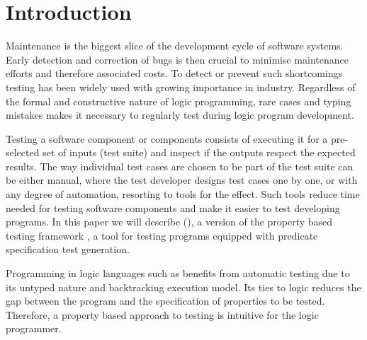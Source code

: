 
\section{Introduction}
\label{sec:intro}


Maintenance is the biggest slice of the development cycle of software
systems.
%
Early detection and correction of bugs is then crucial to minimise
maintenance efforts and therefore associated costs.
%
To detect or prevent such shortcomings testing has been widely used with
growing importance in industry.
%
Regardless of the formal and constructive nature of logic programming,
rare cases and typing mistakes makes it necessary to regularly test
during logic program development.

Testing a software component or components consists of executing it for
a pre-selected set of inputs (test suite) and inspect if the outputs
respect the expected results.
%
%
The way individual test cases are chosen to be part of the test suite
can be either manual, where the test developer designs test cases one by
one, or with any degree of automation, resorting to tools for the
effect.
%
Such tools reduce time needed for testing software components and make
it easier to test developing programs.
%
In this paper we will describe \plqc{} (\Prolog\QuickCheck), a \Prolog{}
version of the property based testing framework \QuickCheck, a tool for
testing \Prolog{} programs equipped with predicate specification
test generation.


Programming in logic languages such as \Prolog{} benefits from automatic
testing due to its untyped nature and backtracking execution model.
%
Its ties to logic reduces the gap between the program and the
specification of properties to be tested.
%
Therefore, a property based approach to testing is intuitive for the
logic programmer.  



